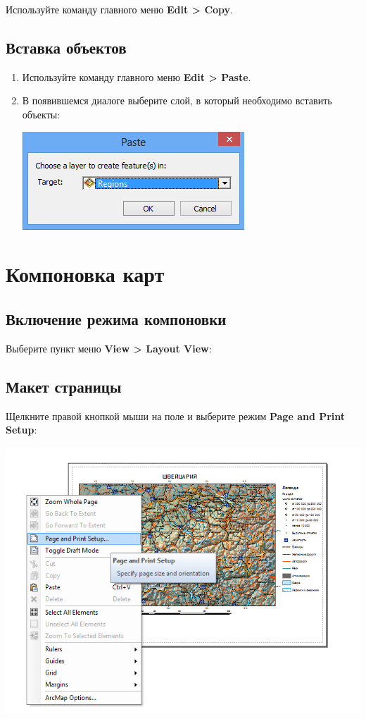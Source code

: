 \documentclass[12pt,]{book}
\begin{document}
Используйте команду главного меню \textbf{Edit \textgreater{} Copy}.

\hypertarget{manual-edit-insert}{%
\section{Вставка объектов}\label{manual-edit-insert}}

\begin{enumerate}
\def\labelenumi{\arabic{enumi}.}
\item
  Используйте команду главного меню \textbf{Edit \textgreater{} Paste}.
\item
  В появившемся диалоге выберите слой, в который необходимо вставить объекты:

  \includegraphics{images/Appendix/image96.png}
\end{enumerate}

\hypertarget{manual-layout}{%
\chapter{Компоновка карт}\label{manual-layout}}

\hypertarget{section-47}{%
\section{Включение режима компоновки}\label{section-47}}

Выберите пункт меню \textbf{View \textgreater{} Layout View}:

\hypertarget{section-48}{%
\section{Макет страницы}\label{section-48}}

Щелкните правой кнопкой мыши на поле и выберите режим \textbf{Page and Print Setup}:

\includegraphics{images/Appendix/image51.png}
\end{document}
